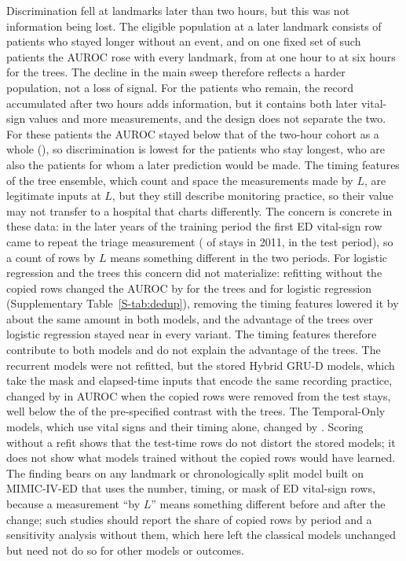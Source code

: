 Discrimination fell at landmarks later than two hours, but this was not information being lost. The eligible population at a later landmark consists of patients who
stayed longer without an event, and on one fixed set of such patients the AUROC rose with every landmark, from \RVFixTreesOne{} at one hour to \RVFixTreesSix{} at
six hours for the trees. The decline in the main sweep therefore reflects a harder population, not a loss of signal. For the patients who remain, the record
accumulated after two hours adds information, but it contains both later vital-sign values and more measurements, and the design does not
separate the two. For these patients the AUROC stayed below that of the two-hour cohort as a whole (\RVAurocXgbT{}), so discrimination is lowest for the
patients who stay longest, who are also the patients for whom a later prediction would be made. The timing features of the tree ensemble, which count and space the measurements made by $L$, are legitimate inputs at $L$,
but they still describe monitoring practice, so their value may not transfer to a hospital that charts differently. The concern is concrete in these data: in the later years of the training period the first ED vital-sign row came to repeat the triage measurement (\RVRecEqTriC{} of stays in 2011, \RVRecEqTriTest{} in the test period), so a count of rows by $L$ means something different in the two periods. For logistic regression and the trees this concern did not materialize: refitting without the copied rows changed the AUROC by \RVDdTreesChange{} for the trees and \RVDdLrChange{} for logistic regression (Supplementary Table~\ref{S-tab:dedup}), removing the timing features lowered it by about the same amount in both models, and the advantage of the trees over logistic regression stayed near \RVOrigTreesOverLr{} in every variant. The timing features therefore contribute to both models and do not explain the advantage of the trees. The recurrent models were not refitted, but the stored Hybrid GRU-D models, which take the mask and elapsed-time inputs that encode the same recording practice, changed by \RVGrudHybridChange{} in AUROC when the copied rows were removed from the test stays, well below the \RVCOneDelta{} of the pre-specified contrast with the trees. The Temporal-Only models, which use vital signs and their timing alone, changed by \RVGrudTempChange{}. Scoring without a refit shows that the test-time rows do not distort the stored models; it does not show what models trained without the copied rows would have learned. The finding bears on any landmark or chronologically split model built on MIMIC-IV-ED that uses the number, timing, or mask of ED vital-sign rows, because a measurement ``by $L$'' means something different before and after the change; such studies should report the share of copied rows by period and a sensitivity analysis without them, which here left the classical models unchanged but need not do so for other models or outcomes.

